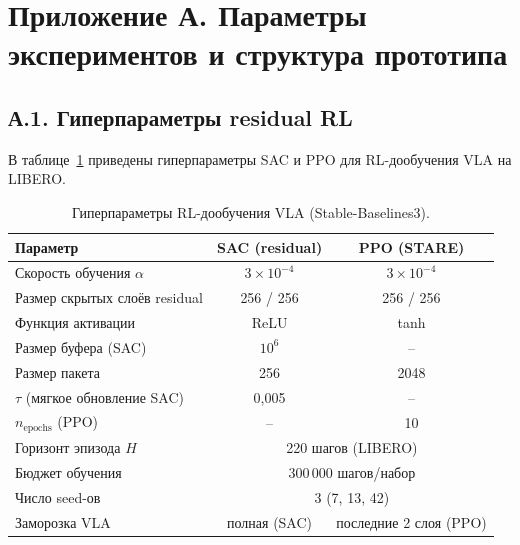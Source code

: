 \chapter*{Приложение А. Параметры экспериментов и структура прототипа}
\label{app:params}

\section*{А.1. Гиперпараметры residual RL}

    В таблице~\ref{tab:hyperparams} приведены гиперпараметры SAC и PPO для RL-дообучения VLA на LIBERO.

\begin{table}[htbp]
\caption{Гиперпараметры RL-дообучения VLA (Stable-Baselines3).}
\label{tab:hyperparams}
\centering
\footnotesize
\setlength{\tabcolsep}{5pt}
\renewcommand{\arraystretch}{1.15}
\begin{tabularx}{\textwidth}{@{}>{\raggedright\arraybackslash}Xcc@{}}
\toprule
\textbf{Параметр} & \textbf{SAC (residual)} & \textbf{PPO (STARE)} \\
\midrule
Скорость обучения $\alpha$       & $3 \times 10^{-4}$ & $3 \times 10^{-4}$ \\
Размер скрытых слоёв residual   & 256 / 256          & 256 / 256 \\
Функция активации                & ReLU               & tanh \\
Размер буфера (SAC)              & $10^6$             & -- \\
Размер пакета                    & 256                & 2048 \\
$\tau$ (мягкое обновление SAC)   & 0,005              & -- \\
$n_{\text{epochs}}$ (PPO)        & --                & 10 \\
Горизонт эпизода $H$             & \multicolumn{2}{c}{220 шагов (LIBERO)} \\
Бюджет обучения                  & \multicolumn{2}{c}{300\,000 шагов/набор} \\
Число seed-ов                    & \multicolumn{2}{c}{3 (7, 13, 42)} \\
Заморозка VLA                    & полная (SAC)       & последние 2 слоя (PPO) \\
\bottomrule
\end{tabularx}
\end{table}

